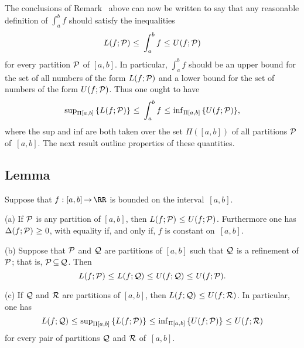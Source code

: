         The conclusions of Remark~ above can now be written to say that
    any reasonable definition of ${\displaystyle \int_{a}^{b} f}$ should satisfy the inequalities
        \begin{displaymath}
        L(f;{\cal P})\,\,{\leq}\,\,\int_{a}^{b} f\,\,{\leq}\,\,U(f;{\cal P})
        \end{displaymath}
    for every partition ${\cal P}$ of $[a,b]$. In particular, $\int_{a}^{b} f$ should be an upper bound for the set of all numbers of the form
    $L(f;{\cal P})$ and a lower bound for the set of numbers of the form $U(f;{\cal P})$.
    Thus one ought to have
        \begin{displaymath}
        {\sup}_{{\Pi}[a,b]}\,\{L(f;{\cal P})\}\,\,{\leq}\,\,\int_{a}^{b} f\,\,{\leq}\,\,{\inf}_{{\Pi}[a,b]}\,\{U(f;{\cal P})\},
        \end{displaymath}
    where the sup and inf are both taken over the set ${\Pi}([a,b])$ of all partitions ${\cal P}$ of~$[a,b]$.
    The next result outline properties of these quantities.

\VV

        \subsection{\small{{\bf Lemma}}}
        \label{LemmaH20.33}

\V

        Suppose that $f:[a,b] \,{\rightarrow}\, {\RR}$ is bounded on the interval~$[a,b]$.

\V

        (a) If ${\cal P}$ is any partition of $[a,b]$, then $L(f;{\cal P})\,\,{\leq}\,\,U(f;{\cal P})$.
    Furthermore one has ${\Delta}(f;{\cal P})\,\,{\geq}\,\,0$, with equality if, and only if, $f$ is constant on~$[a,b]$.

\V

        (b) Suppose that ${\cal P}$ and ${\cal Q}$ are partitions of $[a,b]$ such that ${\cal Q}$ is a refinement of ${\cal P}$; that is, ${\cal P} \,{\subseteq}\, {\cal Q}$. Then
        \begin{displaymath}
        L(f;{\cal P})\,\,{\leq}\,\,L(f;{\cal Q})\,\,{\leq}\,\,U(f;{\cal Q})\,\,{\leq}\,\,U(f;{\cal P}).
        \end{displaymath}

\V

        (c) If ${\cal Q}$ and ${\cal R}$ are partitions of $[a,b]$, then $L(f;{\cal Q})\,\,{\leq}\,\,U(f;{\cal R})$.
    In particular, one has
        \begin{displaymath}
        L(f;{\cal Q})\,\,{\leq}\,\,{\sup}_{{\Pi}[a,b]}\,\{L(f;{\cal P})\}
        \,\,{\leq}\,\,{\inf}_{{\Pi}[a,b]}\,\{U(f;{\cal P})\}
        \,\,{\leq}\,\,U(f;{\cal R})
        \end{displaymath}
    for every pair of partitions ${\cal Q}$ and ${\cal R}$ of~$[a,b]$.


